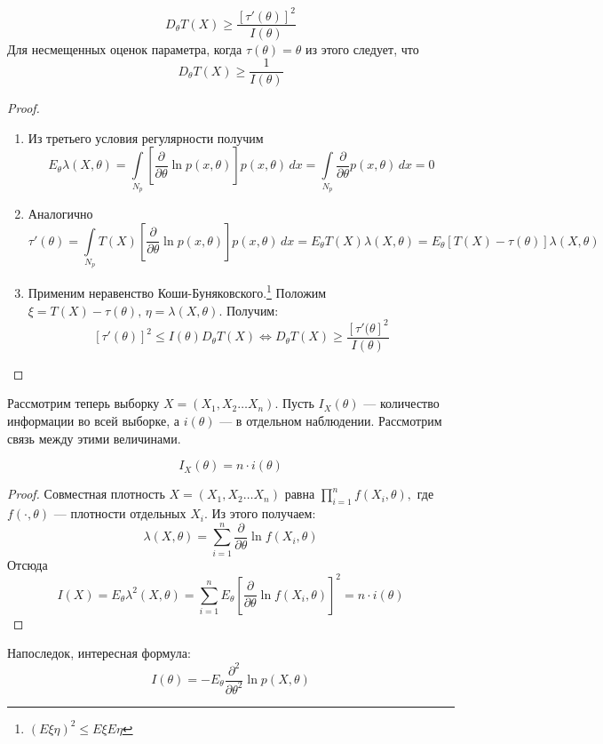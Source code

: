 \documentclass[12pt, russian]{article}
\begin{document}
\begin{theorem}
$$ D_\theta T(X) \geq \frac{[\tau'(\theta)]^2}{I(\theta)}$$
Для несмещенных оценок параметра, когда $\tau(\theta) = \theta$ из этого следует, что 
$$ D_\theta T(X) \geq \frac{1}{I(\theta)}$$
\end{theorem}
\begin{proof}
$ $
\begin{enumerate}
\item Из третьего условия регулярности получим
$$ E_\theta\lambda(X, \theta) = \int\limits_{N_p}{\left[\frac{\partial}{\partial\theta}\ln{p(x, \theta)} \right] p(x, \theta)\,dx} = \int\limits_{N_p}{\frac{\partial}{\partial\theta}p(x, \theta)\,dx} = 0 $$
\item Аналогично  
$$ \tau'(\theta) = \int\limits_{N_p}{T(X) \left[\frac{\partial}{\partial\theta}\ln{p(x, \theta)} \right] p(x, \theta)\,dx} = E_\theta T(X)\lambda(X, \theta) = E_\theta [T(X) - \tau(\theta)]\lambda(X, \theta) $$
\item Применим неравенство Коши-Буняковского.\footnote{$ (E\xi\eta)^2 \leq E\xi E\eta $}
Положим $\xi = T(X) - \tau(\theta),\,\eta = \lambda(X, \theta)$. Получим:
$$ [\tau'(\theta)]^2 \leq I(\theta)D_\theta T(X) \Longleftrightarrow D_\theta T(X) \geq \frac{[\tau'(\theta]^2}{I(\theta)} $$
\end{enumerate}
\end{proof}

Рассмотрим теперь выборку $X = (X_1, X_2 \ldots X_n)$. Пусть $I_X(\theta)$ --- количество информации во всей выборке, а $i(\theta)$ --- в отдельном наблюдении. Рассмотрим связь между этими величинами.

\begin{lemma}
$$ I_X(\theta) = n\cdot i(\theta)$$
\end{lemma}
\begin{proof}
Совместная плотность $X = (X_1, X_2 \ldots X_n)$ равна $\prod\limits_{i=1}^n{f(X_i, \theta)},$ где $f(\cdot, \theta)$ --- плотности отдельных $X_i.$ Из этого получаем:
$$ \lambda(X, \theta) = \sum\limits_{i=1}^n{\frac{\partial}{\partial\theta} \ln{f(X_i, \theta)}} $$
Отсюда 
$$ I(X) = E_\theta \lambda^2(X, \theta) = \sum\limits_{i=1}^n{E_\theta\left[\frac{\partial}{\partial\theta} \ln{f(X_i, \theta)}\right]^2} = n\cdot i(\theta)$$
\end{proof}

Напоследок, интересная формула:
$$ I(\theta) = -E_\theta \frac{\partial^2}{\partial\theta^2}\ln{p(X, \theta)}$$
\end{document}
